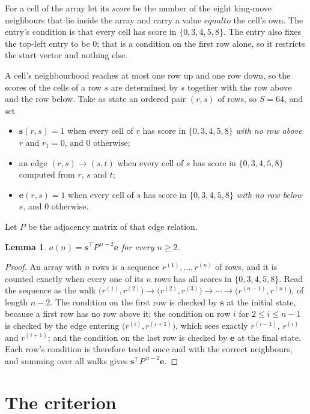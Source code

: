 \documentclass[11pt,a4paper]{article}
\theoremstyle{plain}
\newtheorem{lemma}[theorem]{Lemma}
\theoremstyle{definition}
\begin{document}
For a cell of the array let its \emph{score} be the number of the eight king-move neighbours that lie inside
the array and carry a value $equal to$ the cell's own. The entry's condition is that every cell
has score in $\{0,3,4,5,8\}$. The entry also fixes the top-left entry to be $0$; that is a condition on the first row alone, so it restricts the start vector and nothing else.

A cell's neighbourhood reaches at most one row up and one row down, so the scores of the
cells of a row $s$ are determined by $s$ together with the row above and the row below.
Take as state an ordered pair $(r,s)$ of rows, so $S=64$, and set
\begin{itemize}
\item $\mathbf{s}(r,s)=1$ when every cell of $r$ has score in $\{0,3,4,5,8\}$ \emph{with no row
above $r$} and $r_1=0$, and $0$ otherwise;
\item an edge $(r,s)\to(s,t)$ when every cell of $s$ has score in $\{0,3,4,5,8\}$ computed from
$r$, $s$ and $t$;
\item $\mathbf{e}(r,s)=1$ when every cell of $s$ has score in $\{0,3,4,5,8\}$ \emph{with no row
below $s$}, and $0$ otherwise.
\end{itemize}
Let $P$ be the adjacency matrix of that edge relation.

\begin{lemma}\label{lem:walk}
$a(n)=\mathbf{s}^{\!\top}P^{\,n-2}\mathbf{e}$ for every $n\ge2$.
\end{lemma}

\begin{proof}
An array with $n$ rows is a sequence $r^{(1)},\dots,r^{(n)}$ of rows, and it is counted
exactly when every one of its $n$ rows has all scores in $\{0,3,4,5,8\}$. Read the sequence as the
walk $\bigl(r^{(1)},r^{(2)}\bigr)\to\bigl(r^{(2)},r^{(3)}\bigr)\to\cdots\to
\bigl(r^{(n-1)},r^{(n)}\bigr)$, of length $n-2$. The condition on the first row is
checked by $\mathbf{s}$ at the initial state, because a first row has no row above it; the
condition on row $i$ for $2\le i\le n-1$ is checked by the edge entering
$\bigl(r^{(i)},r^{(i+1)}\bigr)$, which sees exactly $r^{(i-1)}$, $r^{(i)}$ and
$r^{(i+1)}$; and the condition on the last row is checked by $\mathbf{e}$ at the final
state. Each row's condition is therefore tested once and with the correct neighbours, and
summing over all walks gives $\mathbf{s}^{\!\top}P^{\,n-2}\mathbf{e}$.
\end{proof}

\section{The criterion}
\end{document}
